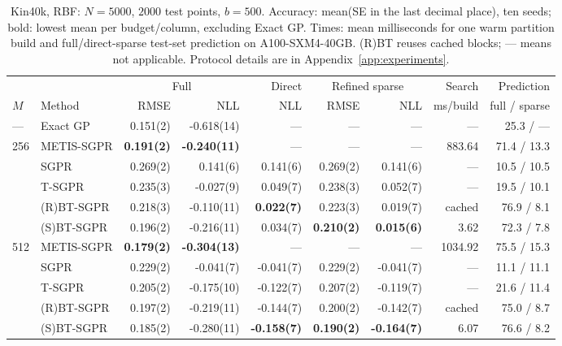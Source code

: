 \begin{table}[b]
\caption{Kin40k, RBF: \(N=5000\), \(2000\) test points, \(b=500\). Accuracy: mean(SE in the last decimal place), ten seeds; bold: lowest mean per budget/column, excluding Exact GP. Times: mean milliseconds for one warm partition build and full/direct-sparse test-set prediction on A100-SXM4-40GB. (R)BT reuses cached blocks; --- means not applicable. Protocol details are in Appendix~\ref{app:experiments}.}
\label{tab:kin40k-sgpr}
\centering\footnotesize
\setlength{\tabcolsep}{3pt}
\renewcommand{\arraystretch}{1.08}
\begin{tabular}{@{}llrrrrrrr@{}}
\toprule
& & \multicolumn{2}{c}{Full} & Direct & \multicolumn{2}{c}{Refined sparse} & Search & Prediction \\
\cmidrule(lr){3-4}\cmidrule(lr){5-5}\cmidrule(lr){6-7}\cmidrule(lr){8-8}\cmidrule(lr){9-9}
\(M\) & Method & RMSE & NLL & NLL & RMSE & NLL & ms/build & full / sparse \\
\midrule
--- & Exact GP & 0.151(2) & -0.618(14) & --- & --- & --- & --- & 25.3 / --- \\
\midrule
256 & METIS-SGPR & \textbf{0.191(2)} & \textbf{-0.240(11)} & --- & --- & --- & 883.64 & 71.4 / 13.3 \\
 & SGPR & 0.269(2) & 0.141(6) & 0.141(6) & 0.269(2) & 0.141(6) & --- & 10.5 / 10.5 \\
 & T-SGPR & 0.235(3) & -0.027(9) & 0.049(7) & 0.238(3) & 0.052(7) & --- & 19.5 / 10.1 \\
 & (R)BT-SGPR & 0.218(3) & -0.110(11) & \textbf{0.022(7)} & 0.223(3) & 0.019(7) & cached & 76.9 / 8.1 \\
 & (S)BT-SGPR & 0.196(2) & -0.216(11) & 0.034(7) & \textbf{0.210(2)} & \textbf{0.015(6)} & 3.62 & 72.3 / 7.8 \\
\midrule
512 & METIS-SGPR & \textbf{0.179(2)} & \textbf{-0.304(13)} & --- & --- & --- & 1034.92 & 75.5 / 15.3 \\
 & SGPR & 0.229(2) & -0.041(7) & -0.041(7) & 0.229(2) & -0.041(7) & --- & 11.1 / 11.1 \\
 & T-SGPR & 0.205(2) & -0.175(10) & -0.122(7) & 0.207(2) & -0.119(7) & --- & 21.6 / 11.4 \\
 & (R)BT-SGPR & 0.197(2) & -0.219(11) & -0.144(7) & 0.200(2) & -0.142(7) & cached & 75.0 / 8.7 \\
 & (S)BT-SGPR & 0.185(2) & -0.280(11) & \textbf{-0.158(7)} & \textbf{0.190(2)} & \textbf{-0.164(7)} & 6.07 & 76.6 / 8.2 \\
\bottomrule
\end{tabular}
\end{table}
